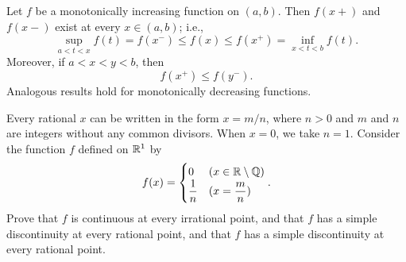 \begin{theorem}[29]
	Let $f$ be a monotonically increasing function on $(a,b)$. Then $f(x+)$ and $f(x-)$ exist at every $x \in (a,b)$; i.e.,
	\[
		\sup_{a<t<x}f(t)=f(x^{-})\le f(x)\le f(x^{+})=\inf_{x<t<b}f(t)
		.\]
	Moreover, if $a<x<y<b$, then
	\[
		f(x^{+})\le f(y^{-})
		.\]
	Analogous results hold for monotonically decreasing functions.
\end{theorem}




\begin{example}[18]
	Every rational $x$ can be written in the form $x=m/n$, where $n>0$ and $m$ and $n$ are integers without any common divisors. When $x=0$, we take $n=1$. Consider the function $f$ defined on $\mathbb{R}^{1}$ by
	\[
		f(x)=
		\begin{cases}
			0            & (x \in \mathbb{R}\setminus \mathbb{Q}) \\
			\dfrac{1}{n} & (x=\dfrac{m}{n})
		\end{cases}
		.\]
	Prove that $f$ is continuous at every irrational point, and that $f$ has a simple discontinuity at every rational point, and that $f$ has a simple discontinuity at every rational point.
\end{example}
